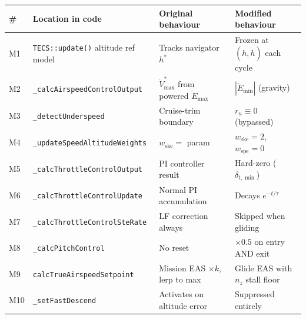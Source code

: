 \documentclass[12pt,a4paper]{article}
\begin{document}
\begin{center}
\renewcommand{\arraystretch}{1.3}
\begin{tabular}{p{0.6cm}p{6.8cm}p{4.2cm}p{4.5cm}}
\toprule
\# & Location in code & Original behaviour & Modified behaviour \\
\midrule
M1 & \texttt{TECS::update()} altitude ref model & Tracks navigator $h^*$ & Frozen at $(h, \dot{h})$ each cycle \\
M2 & \texttt{\_calcAirspeedControlOutput} & $\dot{V}^*_{\max}$ from powered $\dot{E}_{\max}$ & $|\dot{E}_{\min}|$ (gravity) \\
M3 & \texttt{\_detectUnderspeed} & Cruise-trim boundary & $r_u \equiv 0$ (bypassed) \\
M4 & \texttt{\_updateSpeedAltitudeWeights} & $w_{\text{ske}} = $ param & $w_{\text{ske}}=2$, $w_{\text{spe}}=0$ \\
M5 & \texttt{\_calcThrottleControlOutput} & PI controller result & Hard-zero ($\delta_{t,\min}$) \\
M6 & \texttt{\_calcThrottleControlUpdate} & Normal PI accumulation & Decays $e^{-t/\tau}$ \\
M7 & \texttt{\_calcThrottleControlSteRate} & LF correction always & Skipped when gliding \\
M8 & \texttt{\_calcPitchControl} & No reset & $\times 0.5$ on entry AND exit \\
M9 & \texttt{calcTrueAirspeedSetpoint} & Mission EAS $\times k$, lerp to max & Glide EAS with $n_z$ stall floor \\
M10 & \texttt{\_setFastDescend} & Activates on altitude error & Suppressed entirely \\
\bottomrule
\end{tabular}
\end{center}
\end{document}
